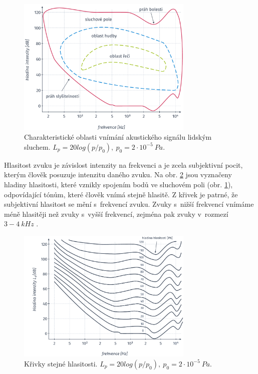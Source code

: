 \begin{figure}[hbpt]
  \centering
  \includegraphics[width=0.75\textwidth]{./ch4-asr/img/listening_perception.pdf}
  \caption[Charakteristické oblasti vnímání akustického signálu.]{Charakteristické oblasti vnímání akustického signálu lidským sluchem. $L_p = 20log(p/p_0),\ p_0 = 2\cdot10^{-5}\ Pa$.}
  \label{fig:asr:mfcc:acoustic:characteristic}
\end{figure}

Hlasitost zvuku je závislost intenzity na frekvenci a je zcela subjektivní pocit, kterým člověk posuzuje intenzitu daného zvuku. Na obr. \ref{fig:asr:mfcc:acoustic:levels} jsou vyznačeny hladiny hlasitosti, které vznikly spojením bodů ve sluchovém poli (obr. \ref{fig:asr:mfcc:acoustic:characteristic}), odpovídající tónům, které člověk vnímá stejně hlasitě. Z křivek je patrné, že subjektivní hlasitost se mění s~frekvencí zvuku. Zvuky s~nižší frekvencí vnímáme méně hlasitěji než zvuky s~vyšší frekvencí, zejména pak zvuky v~rozmezí $3 - 4\ kHz$ \cite{Psutka2006}.

\begin{figure}[hbpt]
  \centering
  \includegraphics[width=0.75\textwidth]{./ch4-asr/img/listening_levels.pdf}
  \caption[Křívky stejné hlasitosti.]{Křivky stejné hlasitosti. $L_p = 20log(p/p_0),\ p_0 = 2\cdot10^{-5}\ Pa$.}
  \label{fig:asr:mfcc:acoustic:levels}
\end{figure}

